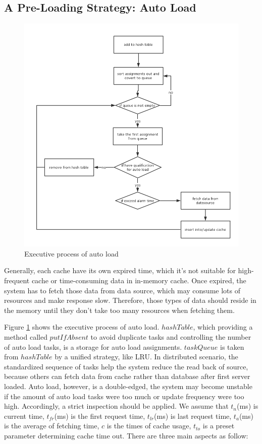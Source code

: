 \documentclass[conference]{IEEEtran}
\begin{document}
\subsection{A Pre-Loading Strategy: Auto Load}

\begin{figure} [htb]
    \centering
    \includegraphics[width=0.9\linewidth]{img/autoload.png}
    \caption{Executive process of auto load}
    \label{process}
\end{figure}

Generally, each cache have its own expired time, which it's not suitable for high-frequent cache or time-consuming data in in-memory cache. Once expired, the system has to fetch those data from data source, which may consume lots of resources and make response slow. Therefore, those types of data should reside in the memory until they don't take too many resources when fetching them.

Figure \ref{process} shows the executive process of auto load. $hashTable$, which providing a method called $putIfAbsent$ to avoid duplicate tasks and controlling the number of auto load tasks, is a storage for auto load assignments. $taskQueue$ is taken from $hashTable$ by a unified strategy, like LRU. In distributed scenario, the standardized sequence of tasks help the system reduce the read back of source, because others can fetch data from cache rather than database after first server loaded. Auto load, however, is a double-edged, the system may become unstable if the amount of auto load tasks were too much or update frequency were too high. Accordingly, a strict inspection should be applied. We assume that $t_n$(ms) is current time, $t_{fr}$(ms) is the first request time, $t_{lr}$(ms) is last request time,  $t_a$(ms) is the average of fetching time, $c$ is the times of cache usage, $t_{to}$ is a preset parameter determining cache time out. There are three main aspects as follow:
\end{document}
